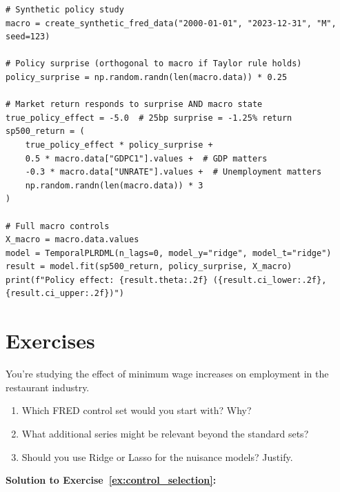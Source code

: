 \begin{verbatim}
# Synthetic policy study
macro = create_synthetic_fred_data("2000-01-01", "2023-12-31", "M", seed=123)

# Policy surprise (orthogonal to macro if Taylor rule holds)
policy_surprise = np.random.randn(len(macro.data)) * 0.25

# Market return responds to surprise AND macro state
true_policy_effect = -5.0  # 25bp surprise = -1.25% return
sp500_return = (
    true_policy_effect * policy_surprise +
    0.5 * macro.data["GDPC1"].values +  # GDP matters
    -0.3 * macro.data["UNRATE"].values +  # Unemployment matters
    np.random.randn(len(macro.data)) * 3
)

# Full macro controls
X_macro = macro.data.values
model = TemporalPLRDML(n_lags=0, model_y="ridge", model_t="ridge")
result = model.fit(sp500_return, policy_surprise, X_macro)
print(f"Policy effect: {result.theta:.2f} ({result.ci_lower:.2f}, {result.ci_upper:.2f})")
\end{verbatim}

\section{Exercises}\label{sec:ch07_exercises}

\begin{exercise}
\label{ex:control_selection}
You're studying the effect of minimum wage increases on employment in the restaurant industry.

\begin{enumerate}
    \item[(a)] Which FRED control set would you start with? Why?
    \item[(b)] What additional series might be relevant beyond the standard sets?
    \item[(c)] Should you use Ridge or Lasso for the nuisance models? Justify.
\end{enumerate}
\end{exercise}

\textbf{Solution to Exercise~\ref{ex:control_selection}:}

